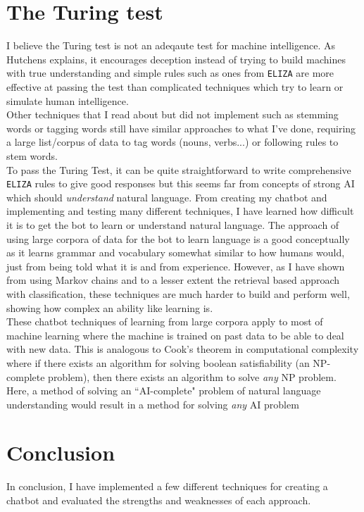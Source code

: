 \documentclass{article}
\newcommand{\n}[0]{\\[\baselineskip]}
\begin{document}
\section{The Turing test} \label{turing}
I believe the Turing test is not an adeqaute test for machine intelligence. As Hutchens \cite{cheating} explains, it encourages deception instead of trying to build machines with true understanding and simple rules such as ones from \texttt{ELIZA} are more effective at passing the test than complicated techniques which try to learn or simulate human intelligence.  
\n
Other techniques that I read about but did not implement such as stemming words or tagging words still have similar approaches to what I've done, requiring a large list/corpus of data to tag words (nouns, verbs...) or following rules to stem words.
\n
To pass the Turing Test, it can be quite straightforward to write comprehensive \texttt{ELIZA} rules to give good responses but this seems far from concepts of strong AI which should \textit{understand} natural language. From creating my chatbot and implementing and testing many different techniques, I have learned how difficult it is to get the bot to learn or understand natural language. The approach of using large corpora of data for the bot to learn language is a good conceptually as it learns grammar and vocabulary somewhat similar to how humans would, just from being told what it is and from experience. However, as I have shown from using Markov chains and to a lesser extent the retrieval based approach with classification, these techniques are much harder to build and perform well, showing how complex an ability like learning is.
\n
These chatbot techniques of learning from large corpora apply to most of machine learning where the machine is trained on past data to be able to deal with new data. This is analogous to Cook's theorem in computational complexity where if there exists an algorithm for solving boolean satisfiability (an NP-complete problem), then there exists an algorithm to solve \textit{any} NP problem. Here, a method of solving an ``AI-complete" problem of natural language understanding would result in a method for solving \textit{any} AI problem
\section{Conclusion}
In conclusion, I have implemented a few different techniques for creating a chatbot and evaluated the strengths and weaknesses of each approach. 

\printbibliography
\end{document}
